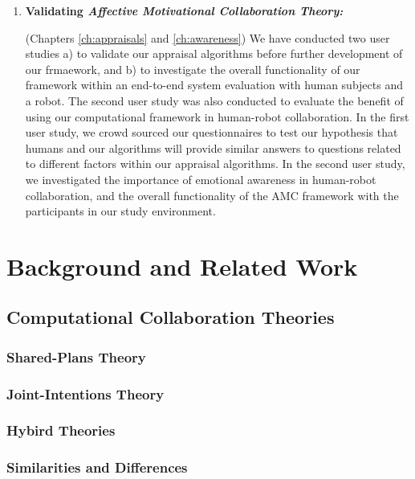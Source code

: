 \documentclass[12pt]{report}
\begin{document}
\begin{enumerate}
  \item \textbf{Validating \textit{Affective Motivational Collaboration
  Theory:}}

  (Chapters \ref{ch:appraisals} and \ref{ch:awareness}) We have conducted two
  user studies a) to validate our appraisal algorithms before further
  development of our frmaework, and b) to investigate the overall functionality
  of our framework within an end-to-end system evaluation with human subjects
  and a robot. The second user study was also conducted to evaluate the benefit
  of using our computational framework in human-robot collaboration. In the
  first user study, we crowd sourced our questionnaires to test our hypothesis
  that humans and our algorithms will provide similar answers to questions
  related to different factors within our appraisal algorithms. In the second
  user study, we investigated the importance of emotional awareness in
  human-robot collaboration, and the overall functionality of the AMC framework
  with the participants in our study environment.
  
\end{enumerate}

\chapter{Background and Related Work}
\label{ch:background}

\section{Computational Collaboration Theories}

\subsection{Shared-Plans Theory}

\subsection{Joint-Intentions Theory}

\subsection{Hybird Theories}

\subsection{Similarities and Differences}
\end{document}
